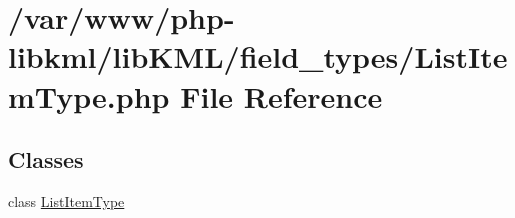 \hypertarget{ListItemType_8php}{
\section{/var/www/php-\/libkml/libKML/field\_\-types/ListItemType.php File Reference}
\label{dc/d8d/ListItemType_8php}
}
\subsection*{Classes}
\begin{DoxyCompactItemize}
\item 
class \hyperlink{classListItemType}{ListItemType}
\end{DoxyCompactItemize}
